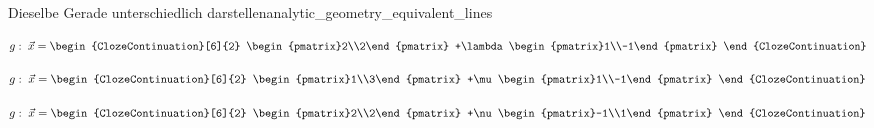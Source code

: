 \begin{ExampleBox}{Dieselbe Gerade unterschiedlich darstellen}{analytic_geometry_equivalent_lines}
  \noindent
  \begin{minipage}[t]{0.32\linewidth}
    \centering
    \begingroup
      \def\LineUnit{0.55}
      \def\LineSupportX{2}\def\LineSupportY{2}
      \def\LineDirectionX{1}\def\LineDirectionY{-1}
      \def\LineLambdaMin{-1.5}\def\LineLambdaMax{1.5}
      \def\LineShowX{0}
    \endgroup
    \[
      g:\;\vec x=\begin{ClozeContinuation}[6]{2}
        \begin{pmatrix}2\\2\end{pmatrix}
        +\lambda\begin{pmatrix}1\\-1\end{pmatrix}
      \end{ClozeContinuation}
    \]
  \end{minipage}\hfill
  \begin{minipage}[t]{0.32\linewidth}
    \centering
    \begingroup
      \def\LineUnit{0.55}
      \def\LineSupportX{1}\def\LineSupportY{3}
      \def\LineDirectionX{1}\def\LineDirectionY{-1}
      \def\LineLambdaMin{-0.5}\def\LineLambdaMax{2.5}
      \def\LineShowX{0}
    \endgroup
    \[
      g:\;\vec x=\begin{ClozeContinuation}[6]{2}
        \begin{pmatrix}1\\3\end{pmatrix}
        +\mu\begin{pmatrix}1\\-1\end{pmatrix}
      \end{ClozeContinuation}
    \]
  \end{minipage}\hfill
  \begin{minipage}[t]{0.32\linewidth}
    \centering
    \begingroup
      \def\LineUnit{0.55}
      \def\LineSupportX{2}\def\LineSupportY{2}
      \def\LineDirectionX{-1}\def\LineDirectionY{1}
      \def\LineLambdaMin{-1.5}\def\LineLambdaMax{1.5}
      \def\LineShowX{0}
    \endgroup
    \[
      g:\;\vec x=\begin{ClozeContinuation}[6]{2}
        \begin{pmatrix}2\\2\end{pmatrix}
        +\nu\begin{pmatrix}-1\\1\end{pmatrix}
      \end{ClozeContinuation}
    \]
  \end{minipage}


\end{ExampleBox}
